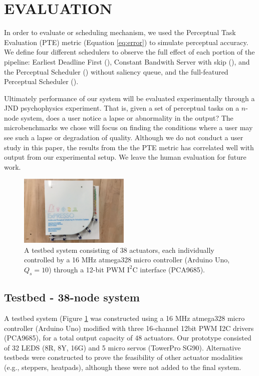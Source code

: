 \documentclass{sigchi}
\newcommand*{\schedule}[1]{{\textbf{\small{\fontfamily{cmss}\selectfont{#1}}}}}
\begin{document}
  \section{EVALUATION}
  In order to evaluate or scheduling mechanism, we used the Perceptual Task Evaluation (PTE) metric (Equation \ref{eq:error}) to simulate perceptual accuracy. We define four different schedulers to observe the full effect of each portion of the pipeline: Earliest Deadline First (\schedule{EDF}), Constant Bandwith Server with skip (\schedule{CBS-S}), and the Perceptual Scheduler (\schedule{PS-A}) without saliency queue, and the full-featured Perceptual Scheduler (\schedule{PS-T}). 

  Ultimately performance of our system will be evaluated experimentally through a JND psychophysics experiment. That is, given a set of perceptual tasks on a $n$-node system, does a user notice a lapse or abnormality in the output? The microbenchmarks we chose will focus on finding the conditions where a user may see such a lapse or degradation of quality. Although we do not conduct a user study in this paper, the results from the the PTE metric has correlated well with output from our experimental setup. We leave the human evaluation for future work. 

    \begin{figure}[t]
      \centering
      \includegraphics[keepaspectratio, width=0.47\textwidth]{figures/testbed.pdf}
      \caption{ A testbed system consisting of 38 actuators, each individually controlled by a 16 MHz atmega328 micro controller (Arduino Uno, $Q_s = 10$) through a 12-bit PWM $\text{I}^2$C interface (PCA9685). }
      \label{fig:testbed} 
    \end{figure}
  \subsection{Testbed - 38-node system}
  A testbed system (Figure \ref{fig:testbed} was constructed using a 16 MHz atmega328 micro controller (Arduino Uno) modified with three 16-channel 12bit PWM I2C drivers (PCA9685), for a total output capacity of 48 actuators. Our prototype consisted of 32 LEDS (8R, 8Y, 16G) and 5 micro servos (TowerPro SG90). Alternative testbeds were constructed to prove the feasibility of other actuator modalities (e.g., steppers, heatpads), although these were not added to the final system. 
\end{document}
